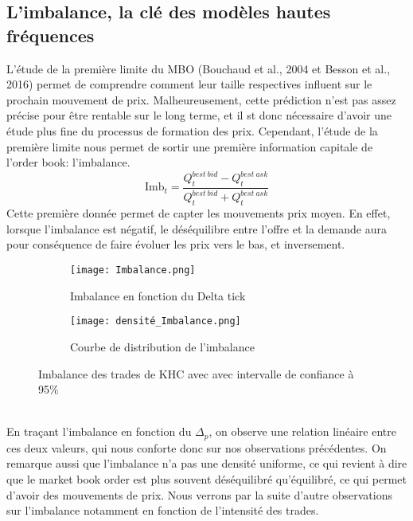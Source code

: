 \documentclass[12pt,a4paper]{article}
\theoremstyle{definition}
\theoremstyle{remark}
\begin{document}
\subsection{L'imbalance, la clé des modèles hautes fréquences}

L'étude de la première limite du MBO (Bouchaud et al., 2004 et Besson et al., 2016) permet de comprendre comment leur taille respectives influent sur le prochain mouvement de prix. Malheureusement, cette prédiction n'est pas assez précise pour être rentable sur le long terme, et il st donc nécessaire d'avoir une étude plus fine du processus de formation des prix. Cependant, l'étude de la première limite nous permet de sortir une première information capitale de l'order book: l'imbalance. 
$$\text{Imb}_t = \frac{Q^{best\ bid}_t-Q^{best\ ask}_t}{Q^{best\ bid}_t+Q^{best\ ask}_t}$$
Cette première donnée permet de capter les mouvements prix moyen. En effet, lorsque l'imbalance est négatif, le déséquilibre entre l'offre et la demande aura pour conséquence de faire évoluer les prix vers le bas, et inversement. 
\begin{figure}[h!]
    \centering
    \begin{subfigure}[b]{0.48\textwidth}
        \centering
        \texttt{[image: Imbalance.png]}
        \caption{Imbalance en fonction du Delta tick}
        \label{fig:imbalance}
    \end{subfigure}
    \hfill
    \begin{subfigure}[b]{0.48\textwidth}
        \centering
        \texttt{[image: densité\_Imbalance.png]}
        \caption{Courbe de distribution de l'imbalance}
        \label{fig:densite_imbalance}
    \end{subfigure}
    \caption{Imbalance des trades de KHC avec avec intervalle de confiance à 95\%}
    \label{fig:comparison}
\end{figure}
\\
En traçant l'imbalance en fonction du $\Delta_p$, on observe une relation linéaire entre ces deux valeurs, qui nous conforte donc sur nos observations précédentes. On remarque aussi que l'imbalance n'a pas une densité uniforme, ce qui revient à dire que le market book order est plus souvent déséquilibré qu'équilibré, ce qui permet d'avoir des mouvements de prix. Nous verrons par la suite d'autre observations sur l'imbalance notamment en fonction de l'intensité des trades.
\\
\\
\end{document}
